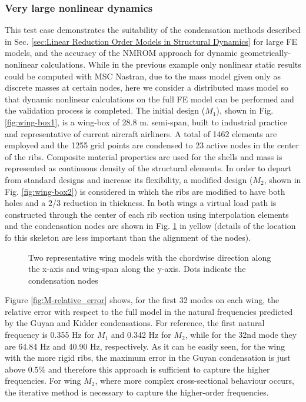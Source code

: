 \documentclass[11pt]{article}
\begin{document}
\subsubsection{Very large nonlinear dynamics}
\label{sec:orgb228a3b}
This test case demonstrates the suitability of the condensation methods described in Sec. \ref{sec:Linear Reduction Order Models in Structural Dynamics} for large FE models, and the accuracy of the NMROM approach for  dynamic geometrically-nonlinear calculations. While in the previous example only nonlinear static results could be computed with MSC Nastran, due to the mass model given only as discrete masses at certain  nodes, here we consider a distributed mass model so that dynamic nonlinear calculations on the full FE model can be performed and the validation process is completed. The initial design ($M_1$), shown in Fig. \ref{fig:wing-box1}, is a wing-box of 28.8 m. semi-span, built to industrial practice and representative of current aircraft airliners. A total of 1462 elements are employed and the 1255 grid points are condensed to 23 active nodes in the center of the ribs. Composite material properties are used for the shells and mass is represented as continuous density of the structural elements. In order to depart from standard designs and increase its flexibility, a modified design ($M_2$, shown in Fig. \ref{fig:wing-box2}) is considered in which the ribs are modified to have both holes and a 2/3 reduction in thickness. In both wings a virtual load path is constructed through the center of each rib section using interpolation elements and the condensation nodes are shown in Fig. \ref{fig:wing-box} in yellow (details of the location fo this skeleton are less important than the alignment of the nodes). 

\begin{figure}[ht!]
\centering
{}
\caption{Two representative wing models with the chordwise direction along the x-axis and wing-span along the y-axis. Dots indicate the condensation nodes}\label{fig:wing-box}
\end{figure}
%
Figure \ref{fig:M-relative_error} shows, for the first 32 modes on each wing, the relative error with respect to the full model in the natural frequencies predicted by the Guyan and Kidder condensations. For reference, the first natural frequency is 0.355 Hz for $M_1$ and 0.342 Hz for $M_2$, while for the 32nd mode they are 64.84 Hz and 40.90 Hz, respectively. As it can be easily seen, for the wing with the more rigid ribs, the maximum error in the Guyan condensation is just above 0.5\% and therefore this approach is sufficient to capture the higher frequencies. For wing $M_2$, where more complex cross-sectional behaviour occurs, the iterative method is necessary to capture the higher-order frequencies.
\end{document}
